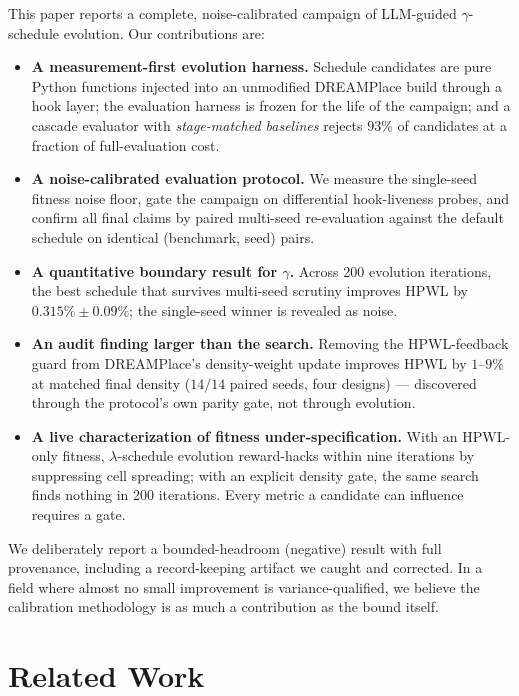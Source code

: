 \documentclass[conference]{IEEEtran}
\begin{document}
This paper reports a complete, noise-calibrated campaign of LLM-guided
$\gamma$-schedule evolution. Our contributions are:
\begin{itemize}
  \item \textbf{A measurement-first evolution harness.} Schedule
        candidates are pure Python functions injected into an unmodified
        DREAMPlace build through a hook layer; the evaluation harness is
        frozen for the life of the campaign; and a cascade evaluator with
        \emph{stage-matched baselines} rejects 93\% of candidates at a
        fraction of full-evaluation cost.
  \item \textbf{A noise-calibrated evaluation protocol.} We measure the
        single-seed fitness noise floor, gate the campaign on differential
        hook-liveness probes, and confirm all final claims by paired
        multi-seed re-evaluation against the default schedule on identical
        (benchmark, seed) pairs.
  \item \textbf{A quantitative boundary result for $\gamma$.} Across 200
        evolution iterations, the best schedule that survives multi-seed
        scrutiny improves HPWL by $0.315\%\pm0.09\%$; the single-seed
        winner is revealed as noise.
  \item \textbf{An audit finding larger than the search.} Removing the
        HPWL-feedback guard from DREAMPlace's density-weight update
        improves HPWL by $1$--$9\%$ at matched final density ($14/14$
        paired seeds, four designs) --- discovered through the protocol's
        own parity gate, not through evolution.
  \item \textbf{A live characterization of fitness under-specification.}
        With an HPWL-only fitness, $\lambda$-schedule evolution
        reward-hacks within nine iterations by suppressing cell spreading;
        with an explicit density gate, the same search finds nothing in
        200 iterations. Every metric a candidate can influence requires a
        gate.
\end{itemize}

We deliberately report a bounded-headroom (negative) result with full
provenance, including a record-keeping artifact we caught and corrected.
In a field where almost no small improvement is variance-qualified, we
believe the calibration methodology is as much a contribution as the
bound itself.

\section{Related Work}
\end{document}
